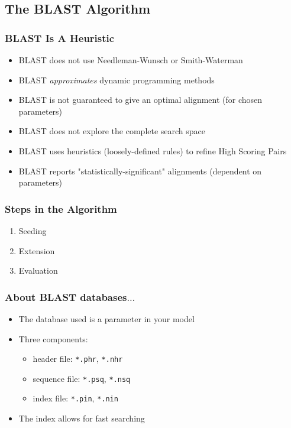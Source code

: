 \documentclass[table]{beamer}
\begin{document}
    \subsection{The BLAST Algorithm}
    \begin{frame}
     \frametitle{BLAST Is A Heuristic}
     \begin{itemize}
       \item<1-> BLAST does not use Needleman-Wunsch or Smith-Waterman
       \item<1-> BLAST \emph{approximates} dynamic programming methods
       \item<1-> BLAST is not guaranteed to give an optimal alignment (for chosen parameters)
       \item<2-> BLAST does not explore the complete search space
       \item<3-> BLAST uses heuristics (loosely-defined rules) to refine High Scoring Pairs
       \item<4-> BLAST reports "statistically-significant" alignments (dependent on parameters)
     \end{itemize}
   \end{frame}

  \begin{frame}
    \frametitle{Steps in the Algorithm}
    \begin{enumerate}
      \item Seeding
      \item Extension
      \item Evaluation
    \end{enumerate}
  \end{frame}

  \begin{frame}
    \frametitle{About BLAST databases$\ldots$}
    \begin{itemize}
      \item The database used is a parameter in your model
      \item Three components:
      \begin{itemize}
        \item header file: \texttt{*.phr}, \texttt{*.nhr}
        \item sequence file: \texttt{*.psq}, \texttt{*.nsq}
        \item index file: \texttt{*.pin}, \texttt{*.nin}
      \end{itemize}
      \item The index allows for fast searching                
    \end{itemize}
  \end{frame}
  
\end{document}
